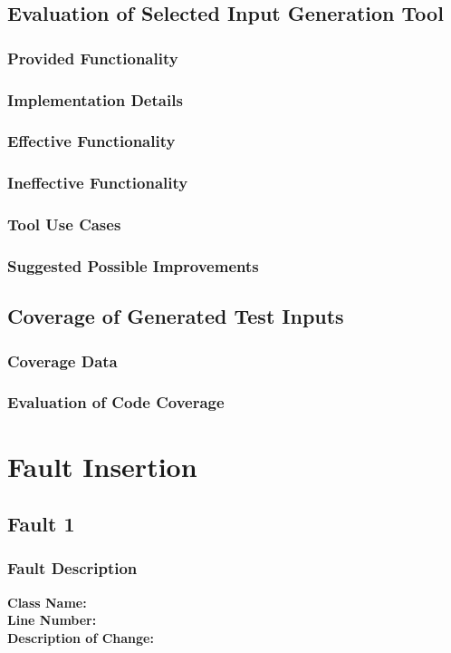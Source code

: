 \documentclass[letterpaper,10pt]{article}
\begin{document}
	\subsection{Evaluation of Selected Input Generation Tool}
		\subsubsection{Provided Functionality}
		\subsubsection{Implementation Details}
		\subsubsection{Effective Functionality}
		\subsubsection{Ineffective Functionality}
		\subsubsection{Tool Use Cases}
		\subsubsection{Suggested Possible Improvements}
	\subsection{Coverage of Generated Test Inputs}
		\subsubsection{Coverage Data}
		\subsubsection{Evaluation of Code Coverage}
\section{Fault Insertion}
	\subsection{Fault 1}
		\subsubsection{Fault Description}
		\textbf{Class Name: } \\
		\textbf{Line Number: } \\
		\textbf{Description of Change: } \\
\end{document}
